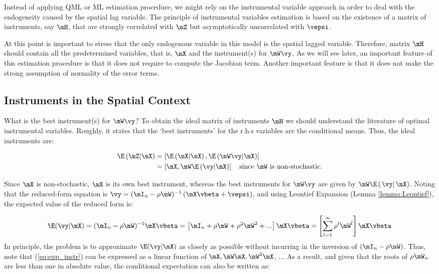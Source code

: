 \documentclass[english,12pt]{book}\usepackage[]{graphicx}\usepackage[]{xcolor}
\begin{document}
Instead of applying QML or ML estimation procedure, we might rely on the instrumental variable approach in order to deal with the endogeneity caused by the spatial lag variable. The principle of instrumental variables estimation is based on the existence of a matrix of instruments, say $\mH$,  that are strongly correlated with $\mZ$ but asymptotically uncorrelated with $\vepsi$. 

At this point is important to stress that the only endogenous variable in this model is the spatial lagged variable. Therefore, matrix $\mH$ should contain all the predetermined variables, that is, $\mX$ and the instrument(s) for $\mW\vy$. As we will see later, an important feature of this estimation procedure is that it does not require to compute the Jacobian term. Another important feature is that it does not make the strong assumption of normality of the error terms. 

\subsection{Instruments in the Spatial Context}

What is the best instrument(s) for $\mW\vy$? To obtain the ideal matrix of instruments $\mH$ we should understand the literature of optimal instrumental variables. Roughly, it states that the `best instruments' for the r.h.s variables are the conditional means. Thus, the ideal instruments are:

\begin{equation*}
  \begin{aligned}
\E\left(\mZ| \mX \right) & = \left[\E\left(\mX| \mX\right), \E\left(\mW\vy| \mX\right)\right] \\
                         & = \left[\mX, \mW \E\left(\vy|\mX\right)\right]\quad \mbox{since $\mW$ is non-stochastic}.
\end{aligned}
\end{equation*}

Since $\mX$ is non-stochastic, $\mX$ is its own best instrument, whereas the best instruments for $\mW\vy$ are given by $\mW\E\left(\left.\vy\right|\mX\right)$. Noting that the reduced-form equation is $\vy = (\mI_n - \rho\mW)^{-1}\left(\mX\vbeta + \vepsi \right)$, and using Leontief Expansion (Lemma \ref{lemma:Leontief}), the expected value of the reduced form is:

\begin{equation}\label{eq:exp_instr}
  \E(\vy|\mX) = (\mI_n - \rho\mW)^{-1}\mX\vbeta = \left[\mI_n + \rho\mW + \rho^2\mW^2 + ...\right]\mX\vbeta = \left[\sum_{l = 1}^{\infty}\rho^{l}\mW^l\right]\mX\vbeta
\end{equation}
%
In principle, the problem is to approximate $\E(\vy|\mX)$ as closely as possible without incurring in the inversion of $(\mI_n - \rho\mW)$. Thus, note that  (\ref{eq:exp_instr}) can be expressed as a linear function of $\mX, \mW\mX, \mW^2\mX$, ... As a result, and given that the roots of $\rho\mW_n$ are less than one in absolute value,  the conditional expectation can also be written as:
\end{document}
